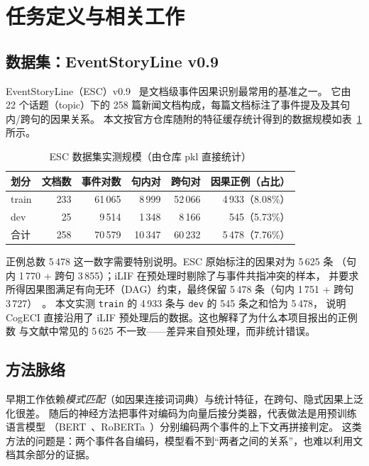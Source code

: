 \section{任务定义与相关工作}
\label{sec:background}

\subsection{数据集：EventStoryLine v0.9}

EventStoryLine（ESC）v0.9~\cite{esc} 是文档级事件因果识别最常用的基准之一。
它由 22 个话题（topic）下的 258 篇新闻文档构成，每篇文档标注了事件提及及其句内/跨句的因果关系。
本文按官方仓库随附的特征缓存统计得到的数据规模如表~\ref{tab:esc} 所示。

\begin{table}[H]
\centering
\caption{ESC 数据集实测规模（由仓库 pkl 直接统计）}
\label{tab:esc}
\begin{tabular}{lrrrrr}
\toprule
划分 & 文档数 & 事件对数 & 句内对 & 跨句对 & 因果正例（占比）\\
\midrule
train & 233 & 61\,065 & 8\,999  & 52\,066 & 4\,933（8.08\%）\\
dev   & 25  & 9\,514  & 1\,348  & 8\,166  & 545（5.73\%）\\
\midrule
合计  & 258 & 70\,579 & 10\,347 & 60\,232 & 5\,478（7.76\%）\\
\bottomrule
\end{tabular}
\end{table}

正例总数 5\,478 这一数字需要特别说明。ESC 原始标注的因果对为 5\,625 条
（句内 1\,770 + 跨句 3\,855）；iLIF 在预处理时剔除了与事件共指冲突的样本，
并要求所得因果图满足有向无环（DAG）约束，最终保留 5\,478 条（句内 1\,751 + 跨句 3\,727）~\cite{ilif}。
本文实测 \texttt{train} 的 4\,933 条与 \texttt{dev} 的 545 条之和恰为 5\,478，
说明 CogECI 直接沿用了 iLIF 预处理后的数据。这也解释了为什么本项目报出的正例数
与文献中常见的 5\,625 不一致——差异来自预处理，而非统计错误。

\subsection{方法脉络}

早期工作依赖\emph{模式匹配}（如因果连接词词典）与统计特征，在跨句、隐式因果上泛化很差。
随后的神经方法把事件对编码为向量后接分类器，代表做法是用预训练语言模型
（BERT~\cite{bert}、RoBERTa~\cite{roberta}）分别编码两个事件的上下文再拼接判定。
这类方法的问题是：两个事件各自编码，模型看不到“两者之间的关系”，也难以利用文档其余部分的证据。

